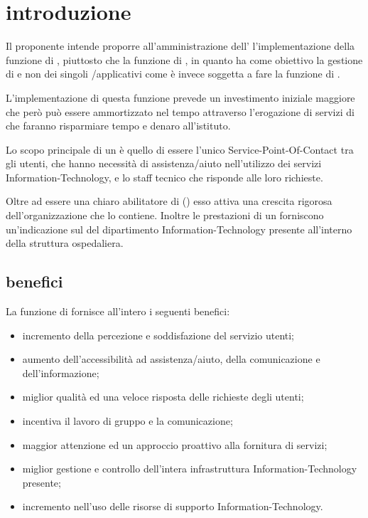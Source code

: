 %
%
\section[Introduzione]{introduzione}
\label{sd-introduction}
Il proponente intende proporre all'amministrazione dell'\entity{} l'implementazione della funzione di , piuttosto che la funzione di , in quanto ha come obiettivo la gestione di  e non dei singoli /applicativi come è invece soggetta a fare la funzione di .

L'implementazione di questa funzione prevede un investimento iniziale maggiore che però può essere ammortizzato nel tempo attraverso l'erogazione di servizi di  che faranno risparmiare tempo e denaro all'istituto.

Lo scopo principale di un  è quello di essere l'unico \ac{Service-Point-Of-Contact} tra gli utenti, che hanno necessità di assistenza/aiuto nell'utilizzo dei servizi \acs{Information-Technology}, e lo staff tecnico che risponde alle loro richieste.

Oltre ad essere una chiaro abilitatore di  () esso attiva una crescita rigorosa dell'organizzazione che lo contiene. Inoltre le prestazioni di un  forniscono un'indicazione sul  del dipartimento \acs{Information-Technology} presente all'interno della struttura ospedaliera.

\subsection[Benefici]{benefici}
\label{sd-introduction-benefit}
La funzione di  fornisce all'intero \entity{} i seguenti benefici:

\begin{itemize}
\item{incremento della percezione e soddisfazione del servizio utenti;}
\item{aumento dell'accessibilità ad assistenza/aiuto, della comunicazione e dell'informazione;}
\item{miglior qualità ed una veloce risposta delle richieste degli utenti;}
\item{incentiva il lavoro di gruppo e la comunicazione;}
\item{maggior attenzione ed un approccio proattivo alla fornitura di servizi;}
\item{miglior gestione e controllo dell'intera infrastruttura \acs{Information-Technology} presente;}
\item{incremento nell'uso delle risorse di supporto \acs{Information-Technology}.}
\end{itemize}

